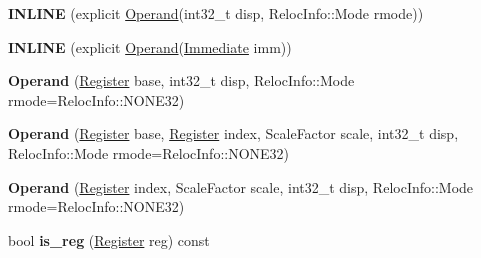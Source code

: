 \begin{DoxyCompactItemize}
\item 
{\bfseries I\+N\+L\+I\+NE} (explicit \hyperlink{classv8_1_1internal_1_1_operand}{Operand}(int32\+\_\+t disp, Reloc\+Info\+::\+Mode rmode))\hypertarget{classv8_1_1internal_1_1_b_a_s_e___e_m_b_e_d_d_e_d_af79379acd1c81ab31a7d4b3d0560d6c9}{}\label{classv8_1_1internal_1_1_b_a_s_e___e_m_b_e_d_d_e_d_af79379acd1c81ab31a7d4b3d0560d6c9}

\item 
{\bfseries I\+N\+L\+I\+NE} (explicit \hyperlink{classv8_1_1internal_1_1_operand}{Operand}(\hyperlink{classv8_1_1internal_1_1_immediate}{Immediate} imm))\hypertarget{classv8_1_1internal_1_1_b_a_s_e___e_m_b_e_d_d_e_d_a91ec35034325008409055687a188e698}{}\label{classv8_1_1internal_1_1_b_a_s_e___e_m_b_e_d_d_e_d_a91ec35034325008409055687a188e698}

\item 
{\bfseries Operand} (\hyperlink{structv8_1_1internal_1_1_register}{Register} base, int32\+\_\+t disp, Reloc\+Info\+::\+Mode rmode=Reloc\+Info\+::\+N\+O\+N\+E32)\hypertarget{classv8_1_1internal_1_1_b_a_s_e___e_m_b_e_d_d_e_d_aaf9395ae2496a44af9a1096003822f07}{}\label{classv8_1_1internal_1_1_b_a_s_e___e_m_b_e_d_d_e_d_aaf9395ae2496a44af9a1096003822f07}

\item 
{\bfseries Operand} (\hyperlink{structv8_1_1internal_1_1_register}{Register} base, \hyperlink{structv8_1_1internal_1_1_register}{Register} index, Scale\+Factor scale, int32\+\_\+t disp, Reloc\+Info\+::\+Mode rmode=Reloc\+Info\+::\+N\+O\+N\+E32)\hypertarget{classv8_1_1internal_1_1_b_a_s_e___e_m_b_e_d_d_e_d_abdb7100ee6180a2b42a79487c48074bc}{}\label{classv8_1_1internal_1_1_b_a_s_e___e_m_b_e_d_d_e_d_abdb7100ee6180a2b42a79487c48074bc}

\item 
{\bfseries Operand} (\hyperlink{structv8_1_1internal_1_1_register}{Register} index, Scale\+Factor scale, int32\+\_\+t disp, Reloc\+Info\+::\+Mode rmode=Reloc\+Info\+::\+N\+O\+N\+E32)\hypertarget{classv8_1_1internal_1_1_b_a_s_e___e_m_b_e_d_d_e_d_a7ccd277bf30133bf507d6159ab10f858}{}\label{classv8_1_1internal_1_1_b_a_s_e___e_m_b_e_d_d_e_d_a7ccd277bf30133bf507d6159ab10f858}

\item 
bool {\bfseries is\+\_\+reg} (\hyperlink{structv8_1_1internal_1_1_register}{Register} reg) const \hypertarget{classv8_1_1internal_1_1_b_a_s_e___e_m_b_e_d_d_e_d_ad0cb4421740c6506eac95a4b308328e5}{}\label{classv8_1_1internal_1_1_b_a_s_e___e_m_b_e_d_d_e_d_ad0cb4421740c6506eac95a4b308328e5}


\end{DoxyCompactItemize}
